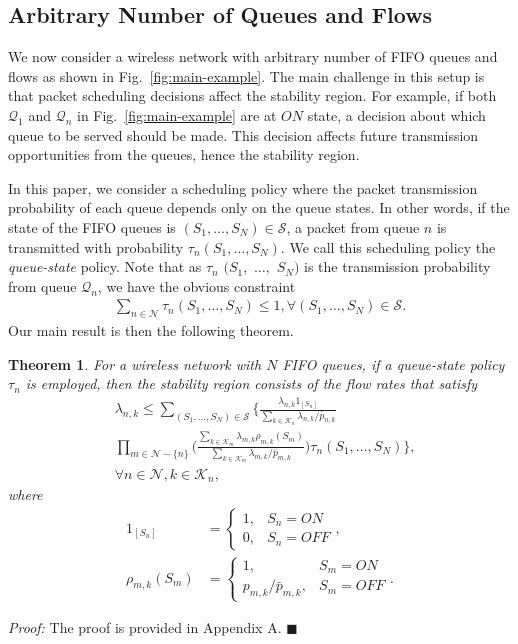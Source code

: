 \documentclass[conference]{IEEEtran}
\newtheorem{theorem}{Theorem}
\newcommand{\Sset}{\mathcal{S}}
\newcommand{\Kset}{\mathcal{K}}
\newcommand{\Nset}{\mathcal{N}}
\newcommand{\Qset}{\mathcal{Q}}
\begin{document}
\subsection{Arbitrary Number of Queues and Flows}
We now consider a wireless network with arbitrary number of FIFO queues and flows as shown in Fig.~\ref{fig:main-example}. 
The main challenge in this setup is that packet scheduling decisions affect the stability region. 
For example, if both $\Qset_1$ and $\Qset_n$ in Fig.~\ref{fig:main-example} are at $ON$ state, a decision about which queue to be served should be made. This decision affects future transmission opportunities from the queues, hence the stability region.

In this paper, we consider a scheduling policy where the packet transmission probability of each queue depends only on the queue states. In other words, if the state of the FIFO queues is $(S_1, \ldots, S_N) \in \Sset$, a packet from queue $n$ is transmitted with probability $\tau_n(S_1, \ldots, S_N)$. We call this scheduling policy the {\em queue-state} policy.
Note that as $\tau_{n}$ $(S_1,$ $\ldots,$ $S_N)$ is the transmission probability from queue $\Qset_{n}$, we have the obvious constraint
 \begin{align}
 \label{eq:sum_tau}
\sum_{n \in \Nset} \tau_{n}(S_1,\ldots,S_N) \leq 1, \forall (S_1,\ldots,S_{N}) \in \Sset.
\end{align}
Our main result is then the following theorem.
\begin{theorem} \label{theorem2}
For a wireless network with $N$ FIFO queues, if a queue-state policy $\tau_{n}$ is employed, then the stability region consists of the flow rates that satisfy
\begin{align} \label{eq:lamdba_nk}
& \lambda_{n,k} \leq  \sum_{(S_1, \ldots, S_N) \in \Sset} \biggl \{ \frac{\lambda_{n,k} 1_{[S_{n}]}}{\sum_{k \in \Kset_{n}} \lambda_{n,k}/\bar{p}_{n,k}} \nonumber \\
& \prod_{m \in \Nset-\{n\}}  \biggr( \frac{\sum_{k \in \Kset_{m}} \lambda_{m,k} \rho_{m,k}(S_m)}{\sum_{k \in \Kset_{m}} \lambda_{m,k}/\bar{p}_{m,k}} \biggl) \tau_{n} (S_1, \ldots, S_N) \biggr \}, \nonumber \\
& \forall n \in \Nset, k \in \Kset_{n},
\end{align} 
where 
\begin{align*}
1_{[S_{n}]} & = \left\{\begin{array}{rl}1,& S_n = ON \\ 0 , & S_{n} = OFF\end{array}\right., \\
\rho_{m,k}(S_m) & = \left\{\begin{array}{rl} 1, & S_m = ON \\ {p_{m,k}}/{\bar{p}_{m,k}}, & S_m = OFF \end{array}  \right..
\end{align*}
\end{theorem}
{\em Proof:} The proof is provided in Appendix A. \hfill $\blacksquare$
\end{document}
